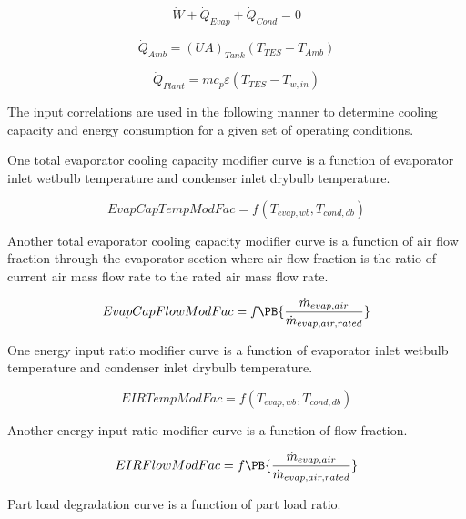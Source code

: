 \begin{equation}
\dot W + {\dot Q_{Evap}} + {\dot Q_{Cond}} = 0
\end{equation}

\begin{equation}
{\dot Q_{Amb}} = {\left( {UA} \right)_{Tank}}\left( {{T_{TES}} - {T_{Amb}}} \right)
\end{equation}

\begin{equation}
{\dot Q_{Plant}} = \dot m{c_p}\varepsilon \left( {{T_{TES}} - {T_{w,in}}} \right)
\end{equation}

The input correlations are used in the following manner to determine cooling capacity and energy consumption for a given set of operating conditions.

One total evaporator cooling capacity modifier curve is a function of evaporator inlet wetbulb temperature and condenser inlet drybulb temperature.

\begin{equation}
EvapCapTempModFac = {f_{}}\left( {{T_{evap,wb}},{T_{cond,db}}} \right)
\end{equation}

Another total evaporator cooling capacity modifier curve is a function of air flow fraction through the evaporator section where air flow fraction is the ratio of current air mass flow rate to the rated air mass flow rate.

\begin{equation}
  EvapCapFlowModFac = f\PB{\frac{\dot{m}_{evap,air}}{\dot{m}_{evap,air,rated}}}
\end{equation}

One energy input ratio modifier curve is a function of evaporator inlet wetbulb temperature and condenser inlet drybulb temperature.

\begin{equation}
EIRTempModFac = f\left( {{T_{evap,wb}},{T_{cond,db}}} \right)
\end{equation}

Another energy input ratio modifier curve is a function of flow fraction.

\begin{equation}
  EIRFlowModFac = f\PB{\frac{\dot{m}_{evap,air}}{\dot{m}_{evap,air,rated}}}
\end{equation}

Part load degradation curve is a function of part load ratio.

